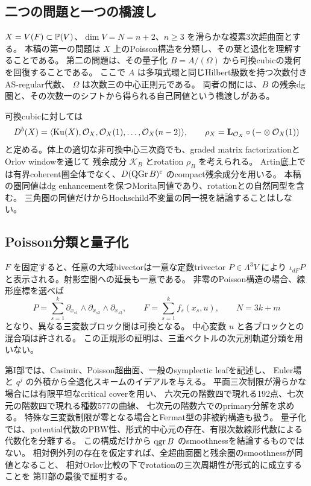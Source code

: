 \subsection{二つの問題と一つの橋渡し}

\(X=V(F)\subset\mathbb P(V)\)、\(\dim V=N=n+2\)、\(n\ge3\) を滑らかな複素3次超曲面とする。
本稿の第一の問題は \(X\) 上のPoisson構造を分類し、その葉と退化を理解することである。
第二の問題は、その量子化 \(B=A/(\Omega)\) から可換cubicの幾何を回復することである。
ここで \(A\) は多項式環と同じHilbert級数を持つ次数付きAS-regular代数、
\(\Omega\) は次数三の中心正則元である。
両者の間には、\(B\) の残余dg圏と、その次数一のシフトから得られる自己同値という橋渡しがある。

可換cubicに対しては
\[
 D^b(X)=\langle\operatorname{Ku}(X),\mathcal O_X,\mathcal O_X(1),\ldots,\mathcal O_X(n-2)\rangle,
 \qquad
 \rho_X=\mathbf L_{\mathcal O_X}\circ(-\otimes\mathcal O_X(1))
\]
と定める。体上の適切な非可換中心三次商でも、graded matrix factorizationとOrlov windowを通じて
残余成分 \(\mathcal K_B\) とrotation \(\rho_B\) を考えられる。
Artin底上では有界coherent圏全体でなく、\(D(\operatorname{QGr} B)^c\) のcompact残余成分を用いる。
本稿の圏同値はdg enhancementを保つMorita同値であり、rotationとの自然同型を含む。
三角圏の同値だけからHochschild不変量の同一視を結論することはしない。

\subsection{Poisson分類と量子化}

\(F\) を固定すると、任意の大域bivectorは一意な定数trivector \(P\in\Lambda^3V\) により
\(\iota_{dF}P\) と表示される。射影空間への延長も一意である。
非零のPoisson構造の場合、線形座標を選べば
\[
 P=\sum_{s=1}^k\partial_{x_{s1}}\wedge\partial_{x_{s2}}\wedge\partial_{x_{s3}},
 \qquad F=\sum_{s=1}^k f_s(x_s,u),\qquad N=3k+m
\]
となり、異なる三変数ブロック間は可換となる。
中心変数 \(u\) と各ブロックとの混合項は許される。
この正規形の証明は、三重ベクトルの次元別軌道分類を用いない。

第I部では、Casimir、Poisson超曲面、一般のsymplectic leafを記述し、
Euler場と \(q^j\) の外積から全退化スキームのイデアルを与える。
平面三次制限が滑らかな場合には有限平坦なcritical coverを用い、
六次元の階数四で現れる192点、七次元の階数四で現れる種数577の曲線、
七次元の階数六でのprimary分解を求める。
特殊な三変数制限が零となる場合とFermat型の非被約構造も扱う。
量子化では、potential代数のPBW性、形式的中心元の存在、有限次数線形代数による代数化を分離する。
この構成だけから \(\operatorname{qgr} B\) のsmoothnessを結論するものではない。
相対例外列の存在を仮定すれば、全超曲面圏と残余圏のsmoothnessが同値となること、
相対Orlov比較の下でrotationの三次周期性が形式的に成立することを
第II部の最後で証明する。


